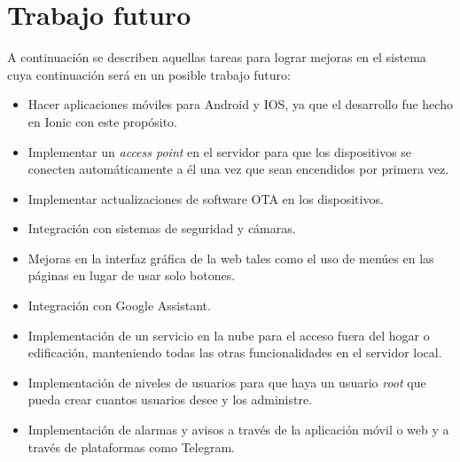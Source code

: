 \section{Trabajo futuro}

A continuación se describen aquellas tareas para lograr mejoras en el sistema cuya continuación será en un posible trabajo futuro:

\begin{itemize}
	\item Hacer aplicaciones móviles para Android y IOS, ya que el desarrollo fue hecho en Ionic con este propósito.
	\item Implementar un \textit{access point} en el servidor para que los dispositivos se conecten automáticamente a él una vez que sean encendidos por primera vez.
	\item Implementar actualizaciones de software OTA en los dispositivos.
	\item Integración con sistemas de seguridad y cámaras.
	\item Mejoras en la interfaz gráfica de la web tales como el uso de menúes en las páginas en lugar de usar solo botones.
	\item Integración con Google Assistant.
	\item Implementación de un servicio en la nube para el acceso fuera del hogar o edificación, manteniendo todas las otras funcionalidades en el servidor local.
	\item Implementación de niveles de usuarios para que haya un usuario \textit{root} que pueda crear cuantos usuarios desee y los administre.
	\item Implementación de alarmas y avisos a través de la aplicación móvil o web y a través de plataformas como Telegram.
\end{itemize}